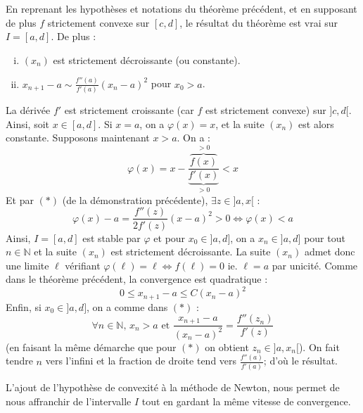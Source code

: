 	\begin{corollary}
		En reprenant les hypothèses et notations du théorème précédent, et en supposant de plus $f$ strictement convexe sur $[c, d]$, le résultat du théorème est vrai sur $I = [a, d]$. De plus :
		\begin{enumerate}[(i)]
			\item $(x_n)$ est strictement décroissante (ou constante).
			\item $x_{n+1} - a \sim \frac{f''(a)}{f'(a)} (x_n - a)^2$ pour $x_0 > a$.
		\end{enumerate}
	\end{corollary}

	\begin{demonstration}
		La dérivée $f'$ est strictement croissante (car $f$ est strictement convexe) sur $]c, d[$. Ainsi, soit $x \in [a, d]$. Si $x = a$, on a $\varphi(x) = x$, et la suite $(x_n)$ est alors constante. Supposons maintenant $x > a$. On a :
		\[ \varphi(x) = x - \frac{\overbrace{f(x)}^{> 0}}{\underbrace{f'(x)}_{> 0}} < x \]
		Et par $(*)$ (de la démonstration précédente), $\exists z \in ]a, x[$ :
		\[ \varphi(x) - a = \frac{f''(z)}{2f'(z)} (x-a)^2 > 0 \iff \varphi(x) < a \]
		Ainsi, $I = [a, d]$ est stable par $\varphi$ et pour $x_0 \in ]a, d]$, on a $x_n \in ]a, d]$ pour tout $n \in \mathbb{N}$ et la suite $(x_n)$ est strictement décroissante. La suite $(x_n)$ admet donc une limite $\ell$ vérifiant $\varphi(\ell) = \ell \iff f(\ell) = 0$ ie. $\ell = a$ par unicité. Comme dans le théorème précédent, la convergence est quadratique :
		\[ 0 \leq x_{n+1} - a \leq C (x_n - a)^2 \]
		Enfin, si $x_0 \in ]a, d]$, on a comme dans $(*)$ :
		\[ \forall n \in \mathbb{N}, \, x_n > a \text{ et } \frac{x_{n+1} - a}{(x_n - a)^2} = \frac{f''(z_n)}{f'(z)} \]
		(en faisant la même démarche que pour $(*)$ on obtient $z_n \in ]a, x_n[$). On fait tendre $n$ vers l'infini et la fraction de droite tend vers $\frac{f''(a)}{f'(a)}$; d'où le résultat.
	\end{demonstration}

	\begin{remark}
		L'ajout de l'hypothèse de convexité à la méthode de Newton, nous permet de nous affranchir de l'intervalle $I$ tout en gardant la même vitesse de convergence.
	\end{remark}

